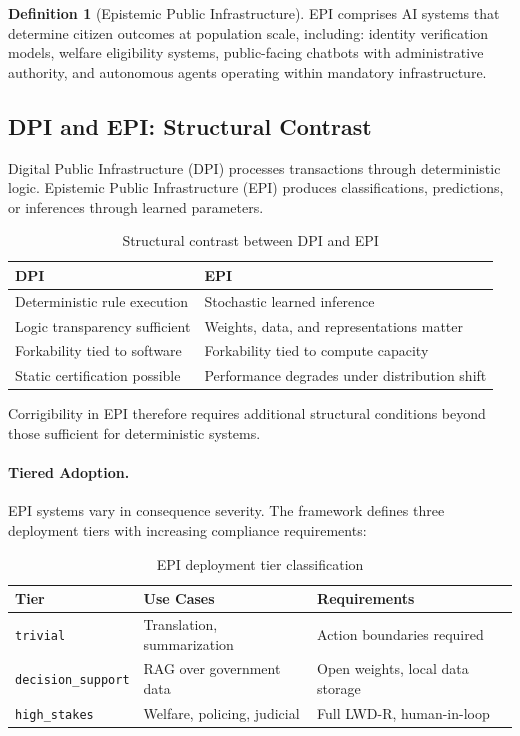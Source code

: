 \documentclass[11pt,a4paper]{article}
\theoremstyle{definition}
\newtheorem{definition}{Definition}[section]
\begin{document}
\begin{definition}[Epistemic Public Infrastructure]
\label{def:epi}
EPI comprises AI systems that determine citizen outcomes at population scale, including: identity verification models, welfare eligibility systems, public-facing chatbots with administrative authority, and autonomous agents operating within mandatory infrastructure.
\end{definition}

\subsection{DPI and EPI: Structural Contrast}
\label{subsec:dpi-epi-contrast}

Digital Public Infrastructure (DPI) processes transactions through deterministic logic. Epistemic Public Infrastructure (EPI) produces classifications, predictions, or inferences through learned parameters.

\begin{table}[htbp]
\centering
\caption{Structural contrast between DPI and EPI}
\label{tab:dpi-epi-contrast}
\begin{tabular}{@{}ll@{}}
\toprule
\textbf{DPI} & \textbf{EPI} \\
\midrule
Deterministic rule execution & Stochastic learned inference \\
Logic transparency sufficient & Weights, data, and representations matter \\
Forkability tied to software & Forkability tied to compute capacity \\
Static certification possible & Performance degrades under distribution shift \\
\bottomrule
\end{tabular}
\end{table}

Corrigibility in EPI therefore requires additional structural conditions beyond those sufficient for deterministic systems.

\paragraph{Tiered Adoption.} EPI systems vary in consequence severity. The framework defines three deployment tiers with increasing compliance requirements:

\begin{table}[htbp]
\centering
\caption{EPI deployment tier classification}
\label{tab:epi-tiers}
\begin{tabular}{@{}lll@{}}
\toprule
\textbf{Tier} & \textbf{Use Cases} & \textbf{Requirements} \\
\midrule
\texttt{trivial} & Translation, summarization & Action boundaries required \\
\texttt{decision\_support} & RAG over government data & Open weights, local data storage \\
\texttt{high\_stakes} & Welfare, policing, judicial & Full LWD-R, human-in-loop \\
\bottomrule
\end{tabular}
\end{table}
\end{document}
